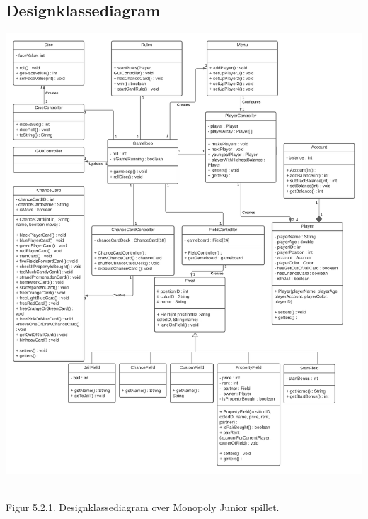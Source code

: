 \begin{flushleft}
\subsection{Designklassediagram}
\begin{center}
\includegraphics[width=1\textwidth]{Report/figures/Class Diagram.png}~\\[0cm]
\end{center}
Figur 5.2.1. Designklassediagram over Monopoly Junior spillet.
\end{flushleft}